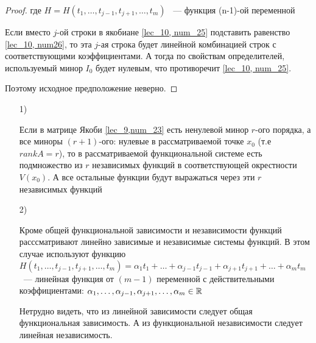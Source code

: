 \documentclass[../../main.tex]{subfiles}
\begin{document}
\begin{proof}
	где $H = H\left( t_1, \ldots, t_{j-1}, t_{j+1}, \ldots, t_m 
	\right)$ ~--- функция (n-1)-ой переменной
	
	Если вместо $j$-ой строки в якобиане \ref{lec_10, num_25}
	подставить равенство \ref{lec_10, num26}, то эта $j$-ая 
	строка будет линейной комбинацией строк с соответствующими 
	коэффициентами. А тогда по свойствам определителей, 
	используемый минор $I_0$ будет нулевым, что противоречит 
	\ref{lec_10, num_25}.
	
	Поэтому исходное предположение неверно.
\end{proof}

\begin{remarks}

	
	
	\begin{itemize}
		Полученные результаты обощаются в следующем виде:
		
		\item[1)]
		
		Если в матрице Якоби \ref{lec_9,num_23} есть ненулевой 
		минор $r$-ого порядка, а все миноры $(r+1)$-ого: нулевые 
		в рассматриваемой точке $x_0$ (т.е $rankA = r$), то в 
		рассматриваемой функциональной системе есть подмножество 
		из $r$ независимых функций в соответствующей окрестности 
		$V(x_0)$. А все остальные функции будут выражаться через 
		эти $r$ независимых функций
		
		\item[2)]
		
		Кроме общей функциональной зависимости и независимости 
		функций расссматривают линейно зависимые и независимые 
		системы функций. В этом случае используют функцию 
		$H\left( t_1, \ldots, t_{j-1}, t_{j+1}, \ldots, t_m 
		\right) = \alpha_1 t_1 + \ldots + \alpha_{j-1} t_{j-1} + 
		\alpha_{j+1} t_{j+1} + \ldots + \alpha_m t_m$ ~--- 
		линейная функция от $(m-1)$ переменной с действительными 
		коэффициентами: $\alpha_1, \ldots, \alpha_{j-1}, 
		\alpha_{j+1}, \ldots, \alpha_m \in \mathbb{R}$
	
		Нетрудно видеть, что из линейной зависимости следует 
		общая функциональная зависимость. А из функциональной 
		независимости следует линейная независимость.
	\end{itemize}
\end{remarks}
\end{document}
